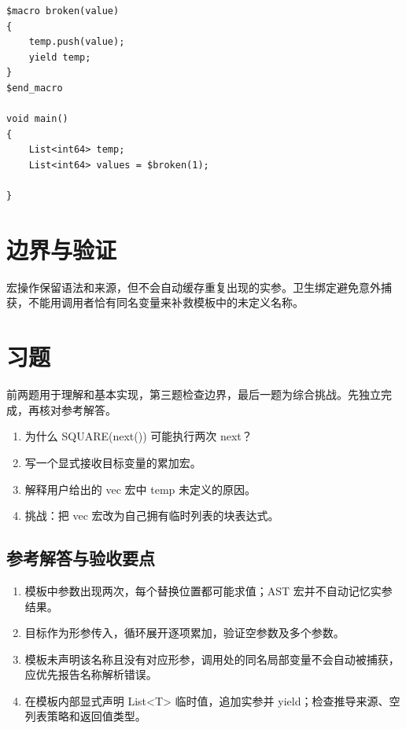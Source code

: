 \par
\medskip
\begin{lstlisting}[style=chali]
$macro broken(value)
{
    temp.push(value);
    yield temp;
}
$end_macro

void main()
{
    List<int64> temp;
    List<int64> values = $broken(1);

}
\end{lstlisting}
\par
\medskip

\section{边界与验证}

宏操作保留语法和来源，但不会自动缓存重复出现的实参。卫生绑定避免意外捕获，不能用调用者恰有同名变量来补救模板中的未定义名称。

\section{习题}

前两题用于理解和基本实现，第三题检查边界，最后一题为综合挑战。先独立完成，再核对参考解答。

\begin{enumerate}

\item 为什么 SQUARE(next()) 可能执行两次 next？

\item 写一个显式接收目标变量的累加宏。

\item 解释用户给出的 vec 宏中 temp 未定义的原因。

\item 挑战：把 vec 宏改为自己拥有临时列表的块表达式。

\end{enumerate}

\subsection*{参考解答与验收要点}

\begin{enumerate}

\item 模板中参数出现两次，每个替换位置都可能求值；AST 宏并不自动记忆实参结果。

\item 目标作为形参传入，循环展开逐项累加，验证空参数及多个参数。

\item 模板未声明该名称且没有对应形参，调用处的同名局部变量不会自动被捕获，应优先报告名称解析错误。

\item 在模板内部显式声明 List<T> 临时值，追加实参并 yield；检查推导来源、空列表策略和返回值类型。

\end{enumerate}

